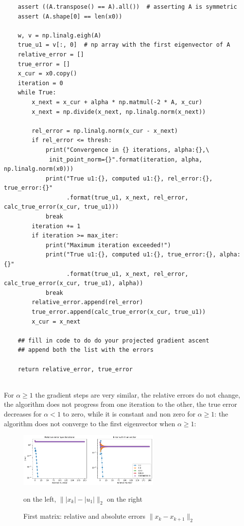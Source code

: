 \documentclass[12pt,twoside]{article}
\begin{document}
\begin{enumerate}
\begin{enumerate}
\begin{verbatim}
    assert ((A.transpose() == A).all())  # asserting A is symmetric
    assert (A.shape[0] == len(x0))

    w, v = np.linalg.eigh(A)
    true_u1 = v[:, 0]  # np array with the first eigenvector of A
    relative_error = []
    true_error = []
    x_cur = x0.copy()
    iteration = 0
    while True:
        x_next = x_cur + alpha * np.matmul(-2 * A, x_cur)
        x_next = np.divide(x_next, np.linalg.norm(x_next))

        rel_error = np.linalg.norm(x_cur - x_next)
        if rel_error <= thresh:
            print("Convergence in {} iterations, alpha:{},\
             init_point_norm={}".format(iteration, alpha, np.linalg.norm(x0)))
            print("True u1:{}, computed u1:{}, rel_error:{}, true_error:{}"
                  .format(true_u1, x_next, rel_error, calc_true_error(x_cur, true_u1)))
            break
        iteration += 1
        if iteration >= max_iter:
            print("Maximum iteration exceeded!")
            print("True u1:{}, computed u1:{}, true_error:{}, alpha:{}"
                  .format(true_u1, x_next, rel_error, calc_true_error(x_cur, true_u1), alpha))
            break
        relative_error.append(rel_error)
        true_error.append(calc_true_error(x_cur, true_u1))
        x_cur = x_next

    ## fill in code to do do your projected gradient ascent
    ## append both the list with the errors

    return relative_error, true_error
        
\end{verbatim}

For  $\alpha \ge 1$ the gradient steps are very similar, the relative errors do not change, the algorithm does not progress from one iteration to the other, the true error decreases
for $\alpha < 1$ to zero, while it is constant and non zero for $\alpha \ge 1$: the algorithm does not converge to the first eigenvector when $\alpha \ge 1$:

\begin{figure}[H]
	\centering
	\includegraphics[width=200pt]{figures/random_init_2.pdf}
	\caption{First matrix: relative and absolute errors  $\| x_k - x_{k+1}\|_2$} on the left,  $\| |x_k| - |u_1| \|_2$ on the right
	\label{fig1}
\end{figure}


\end{enumerate}
\end{enumerate}
\end{document}
